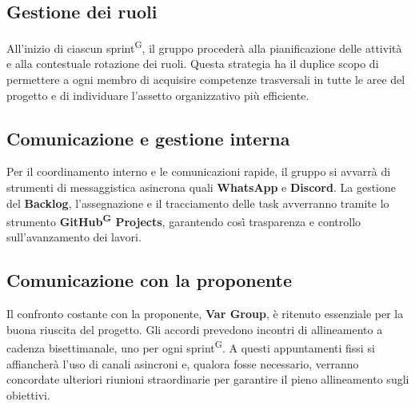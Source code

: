 \documentclass[a4paper, 11pt]{article}
\begin{document}
\subsection{Gestione dei ruoli}
All'inizio di ciascun sprint\textsuperscript{G}, il gruppo procederà alla pianificazione delle attività e alla contestuale rotazione dei ruoli. Questa strategia ha il duplice scopo di permettere a ogni membro di acquisire competenze trasversali in tutte le aree del progetto e di individuare l'assetto organizzativo più efficiente.

\subsection{Comunicazione e gestione interna}
Per il coordinamento interno e le comunicazioni rapide, il gruppo si avvarrà di strumenti di messaggistica asincrona quali \textbf{WhatsApp} e \textbf{Discord}.
La gestione del \textbf{Backlog}, l'assegnazione e il tracciamento delle task avverranno tramite lo strumento \textbf{GitHub\textsuperscript{G} Projects}, garantendo così trasparenza e controllo sull'avanzamento dei lavori.

\subsection{Comunicazione con la proponente}
Il confronto costante con la proponente, \textbf{Var Group}, è ritenuto essenziale per la buona riuscita del progetto.
Gli accordi prevedono incontri di allineamento a cadenza bisettimanale, uno per ogni sprint\textsuperscript{G}. A questi appuntamenti fissi si affiancherà l'uso di canali asincroni e, qualora fosse necessario, verranno concordate ulteriori riunioni straordinarie per garantire il pieno allineamento sugli obiettivi.

\newpage
\end{document}
